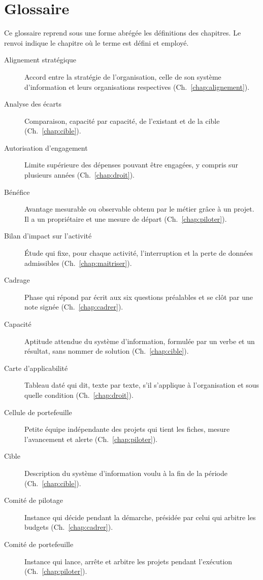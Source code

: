 \chapter{Glossaire}
\label{ann:glossaire}

Ce glossaire reprend sous une forme abrégée les définitions des chapitres. Le renvoi indique le chapitre où le terme est défini et employé.

\begin{description}
    \item[Alignement stratégique] Accord entre la stratégie de l'organisation, celle de son système d'information et leurs organisations respectives (Ch.~\ref{chap:alignement}).
    \item[Analyse des écarts] Comparaison, capacité par capacité, de l'existant et de la cible (Ch.~\ref{chap:cible}).
    \item[Autorisation d'engagement] Limite supérieure des dépenses pouvant être engagées, y compris sur plusieurs années (Ch.~\ref{chap:droit}).
    \item[Bénéfice] Avantage mesurable ou observable obtenu par le métier grâce à un projet. Il a un propriétaire et une mesure de départ (Ch.~\ref{chap:piloter}).
    \item[Bilan d'impact sur l'activité] Étude qui fixe, pour chaque activité, l'interruption et la perte de données admissibles (Ch.~\ref{chap:maitriser}).
    \item[Cadrage] Phase qui répond par écrit aux six questions préalables et se clôt par une note signée (Ch.~\ref{chap:cadrer}).
    \item[Capacité] Aptitude attendue du système d'information, formulée par un verbe et un résultat, sans nommer de solution (Ch.~\ref{chap:cible}).
    \item[Carte d'applicabilité] Tableau daté qui dit, texte par texte, s'il s'applique à l'organisation et sous quelle condition (Ch.~\ref{chap:droit}).
    \item[Cellule de portefeuille] Petite équipe indépendante des projets qui tient les fiches, mesure l'avancement et alerte (Ch.~\ref{chap:piloter}).
    \item[Cible] Description du système d'information voulu à la fin de la période (Ch.~\ref{chap:cible}).
    \item[Comité de pilotage] Instance qui décide pendant la démarche, présidée par celui qui arbitre les budgets (Ch.~\ref{chap:cadrer}).
    \item[Comité de portefeuille] Instance qui lance, arrête et arbitre les projets pendant l'exécution (Ch.~\ref{chap:piloter}).

\end{description}
